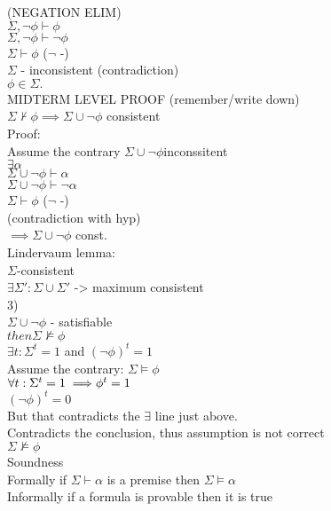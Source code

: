 \documentclass[12pt,oneside,fleqn]{article}
\theoremstyle{definition}
\begin{document}
(NEGATION ELIM) \\
$\Sigma, \neg \phi \vdash \phi$ \\
$\Sigma, \neg \phi \vdash \neg \phi$ \\
$\Sigma \vdash \phi$ ($\neg$ -) \\

$\Sigma$ - inconsistent (contradiction) \\
$\phi \in \Sigma.$ \\

MIDTERM LEVEL PROOF (remember/write down) \\
$\Sigma \not \vdash \phi \implies \Sigma \cup { \neg \phi }$ consistent  \\
Proof: \\
Assume the contrary $\Sigma \cup { \neg \phi } $inconssitent \\
$\exists \alpha$ \\
$\Sigma \cup { \neg \phi} \vdash \alpha$ \\
$\Sigma \cup { \neg \phi } \vdash \neg \alpha$ \\
$\Sigma \vdash \phi$ ($\neg$ -) \\
(contradiction with hyp) \\
$\implies \Sigma \cup { \neg \phi}$ const.  \\

Lindervaum lemma: \\
$\Sigma$-consistent \\
$\exists \Sigma' : \Sigma \cup \Sigma'$ -> maximum consistent \\

3) \\
$\Sigma \cup { \neg \phi }$ - satisfiable \\
$then \Sigma \not \vDash \phi$ \\

$\exists t: \Sigma^t = 1$ and $(\neg \phi)^t = 1$ \\
Assume the contrary: $\Sigma \vDash \phi$ \\
$\forall t: \Sigma ^t =1 \implies \\
 \phi ^t = 1$ \\
$(\neg \phi)^t = 0$ \\
But that contradicts the $\exists$ line just above. \\
Contradicts the conclusion, thus assumption is not correct \\
$\Sigma \not \vDash \phi$ \\

 
Soundness \\
Formally if $\Sigma \vdash \alpha$ is a premise then $\Sigma \vDash \alpha$ \\
Informally if a formula is provable then it is true \\
\end{document}
